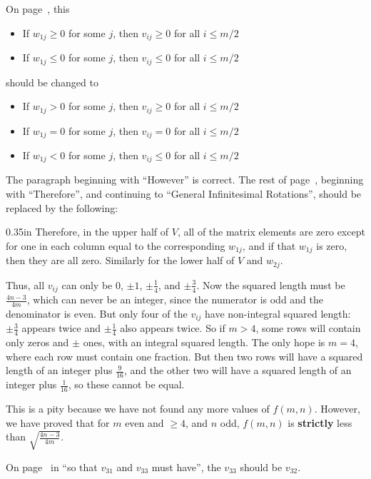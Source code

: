 On page~\pageref{refpage19}, this
\begin{itemize}
\item[]{If $w_{1j} \geq 0$ for some $j$, then $v_{ij} \geq 0$ for all $i \leq m/2$}
\item[]{If $w_{1j} \leq 0$ for some $j$, then $v_{ij} \leq 0$ for all $i \leq m/2$}
\end{itemize}
should be changed to
\begin{itemize}
\item[]{If $w_{1j} > 0$ for some $j$, then $v_{ij} \geq 0$ for all $i \leq m/2$}
\item[]{If $w_{1j} = 0$ for some $j$, then $v_{ij} =    0$ for all $i \leq m/2$}
\item[]{If $w_{1j} < 0$ for some $j$, then $v_{ij} \leq 0$ for all $i \leq m/2$}
\end{itemize}
The paragraph beginning with ``However'' is correct.  The rest of
page~\pageref{refpage20}, beginning with ``Therefore'', and continuing to
``General Infinitesimal Rotations'', should be replaced by the following:
\begin{adjustwidth}{0.35in}{}
Therefore, in the upper half of $V$, all of the matrix elements are zero
except for one in each column equal to the corresponding $w_{1j}$, and if that
$w_{1j}$ is zero, then they are all zero.  Similarly for the lower half of $V$
and $w_{2j}$.

Thus, all $v_{ij}$ can only be 0, $\pm1$, $\pm\frac{1}{4}$, and
$\pm\frac{3}{4}$.  Now the squared length must be $\frac{4n-3}{4m}$, which can
never be an integer, since the numerator is odd and the denominator is even.
But only four of the $v_{ij}$ have non-integral squared length:
$\pm\frac{3}{4}$ appears twice and $\pm\frac{1}{4}$ also appears twice.  So if
$m > 4$, some rows will contain only zeros and $\pm$ ones, with an integral
squared length.  The only hope is $m = 4$, where each row must contain one
fraction.  But then two rows will have a squared length of an integer plus
$\frac{9}{16}$, and the other two will have a squared length of an integer
plus $\frac{1}{16}$, so these cannot be equal.

This is a pity because we have not found any more values of $f(m,n)$.
However, we have proved that for $m$ even and $\geq 4$, and $n$ odd, $f(m,n)$
is {\bf strictly} less than $\sqrt{\frac{4n-3}{4m}}$.
\end{adjustwidth}

On page~\pageref{refpage24} in ``so that $v_{31}$ and $v_{33}$ must have'',
the $v_{33}$ should be $v_{32}$.

